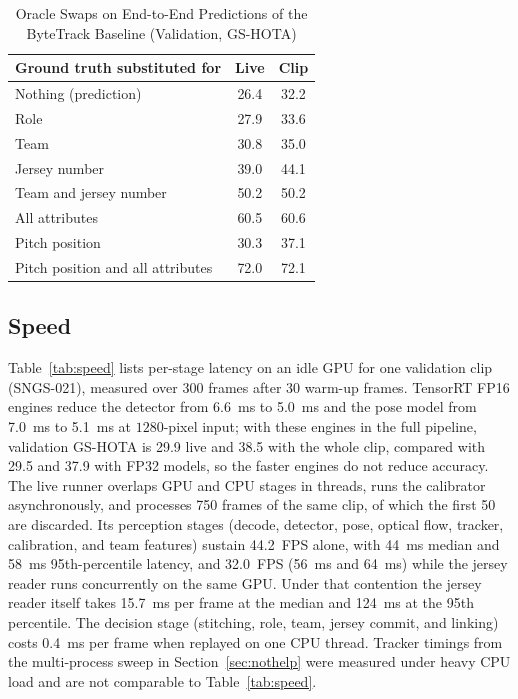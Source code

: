 \documentclass[conference]{IEEEtran}
\begin{document}
\begin{table}[t]
\caption{Oracle Swaps on End-to-End Predictions of the ByteTrack Baseline (Validation, GS-HOTA)}
\label{tab:oracle}
\centering
\footnotesize
\begin{tabular}{@{}lcc@{}}
\toprule
Ground truth substituted for & Live & Clip \\
\midrule
Nothing (prediction) & 26.4 & 32.2 \\
Role & 27.9 & 33.6 \\
Team & 30.8 & 35.0 \\
Jersey number & 39.0 & 44.1 \\
Team and jersey number & 50.2 & 50.2 \\
All attributes & 60.5 & 60.6 \\
Pitch position & 30.3 & 37.1 \\
Pitch position and all attributes & 72.0 & 72.1 \\
\bottomrule
\end{tabular}
\end{table}

\subsection{Speed}\label{sec:speed}
Table~\ref{tab:speed} lists per-stage latency on an idle GPU for one validation clip (SNGS-021), measured over 300 frames after 30 warm-up frames. TensorRT FP16 engines reduce the detector from 6.6~ms to 5.0~ms and the pose model from 7.0~ms to 5.1~ms at $1280$-pixel input; with these engines in the full pipeline, validation GS-HOTA is 29.9 live and 38.5 with the whole clip, compared with 29.5 and 37.9 with FP32 models, so the faster engines do not reduce accuracy. The live runner overlaps GPU and CPU stages in threads, runs the calibrator asynchronously, and processes 750 frames of the same clip, of which the first 50 are discarded. Its perception stages (decode, detector, pose, optical flow, tracker, calibration, and team features) sustain 44.2~FPS alone, with 44~ms median and 58~ms 95th-percentile latency, and 32.0~FPS (56~ms and 64~ms) while the jersey reader runs concurrently on the same GPU. Under that contention the jersey reader itself takes 15.7~ms per frame at the median and 124~ms at the 95th percentile. The decision stage (stitching, role, team, jersey commit, and linking) costs 0.4~ms per frame when replayed on one CPU thread. Tracker timings from the multi-process sweep in Section~\ref{sec:nothelp} were measured under heavy CPU load and are not comparable to Table~\ref{tab:speed}.
\end{document}
